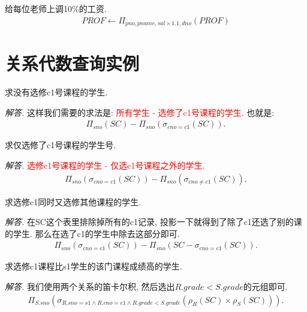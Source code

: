 \begin{example}
    给每位老师上调10\%的工资.
    \begin{align*}
        PROF \leftarrow \Pi_{pno,pname,sal\times 1.1,dno}(PROF)
    \end{align*}
\end{example}

\section{关系代数查询实例}

\begin{problem}
    求没有选修c1号课程的学生.
\end{problem}
\textit{ 解答. }这样我们需要的求法是: \textcolor{red}{所有学生 - 选修了c1号课程的学生}.
也就是:
\begin{align*}
    \Pi_{sno}(SC) - \Pi_{sno}(\sigma_{cno=c1}(SC)).
\end{align*}

\begin{problem}
    求仅选修了c1号课程的学生号.
\end{problem}
\textit{ 解答. }\textcolor{red}{选修c1号课程的学生 - 仅选c1号课程之外的学生}.
\begin{align*}
    \Pi_{sno}(\sigma_{cno=c1}(SC))-\Pi_{sno}(\sigma_{cno\neq c1}(SC)).
\end{align*}

\begin{problem}
    求选修c1同时又选修其他课程的学生.
\end{problem}
\textit{ 解答. }在SC这个表里排除掉所有的c1记录, 投影一下就得到了除了c1还选了别的课的学生. 那么在选了c1的学生中除去这部分即可.
\begin{align*}
    \Pi_{sno}(\sigma_{cno=c1}(SC))-\Pi_{sno}(SC-\sigma_{cno=c1}(SC)).
\end{align*}

\begin{problem}
    求选修c1课程比s1学生的该门课程成绩高的学生.
\end{problem}
\textit{ 解答. }我们使用两个关系的笛卡尔积, 然后选出$R.grade<S.grade$的元组即可.
\begin{align*}
    \Pi_{S.sno}(\sigma_{R.sno=s1\land R.cno=c1\land R.grade<S.grade}(\rho_R(SC)\times \rho_S(SC))).
\end{align*}

